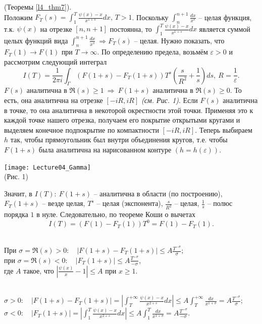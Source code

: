 \begin{pf} (Теоремы \ref{l4_thm7}).\\
	Положим $\displaystyle F_T(s) = \int_1^T \frac{\psi(x)-x}{x^{1+s}}dx, \, T>1$. Поскольку $\displaystyle \int_n^{n+1}\frac{dx}{x^s}$ -- целая функция, т.к. $\psi(x)$ на отрезке $[n, n+1]$ постоянна, то $\displaystyle \int_1^T \frac{\psi(x)-x}{x^{1+s}}dx$ является суммой целых функций вида $\displaystyle \int_n^{n+1}\frac{dx}{x^s} \ \Rightarrow F_T(s)$ -- целая. Нужно показать, что $F_T(1) \to F(1)$ при $T \to \infty$. По определению предела, возьмём $\varepsilon > 0$ и  рассмотрим следующий интеграл
	$$I(T) = \frac{1}{2\pi i}\int_\Gamma \left( F(1+s)-F_T(1+s) \right)T^s\left(\frac{s}{R^2}+\frac{1}{s}\right)ds, \ R = \frac{1}{\varepsilon}.$$
	$F(s)$ аналитична в $\Re(s) \geq 1 \ \Rightarrow \ F(1+s)$ аналитична в $\Re(s) \geq 0$. То есть, она аналитична на отрезке $[-iR, iR]$ \textit{(см. Рис. 1)}. Если $F(s)$ аналитична в точке, то она аналитична в некоторой окрестности этой точки. Применяя это к каждой точке нашего отрезка, получаем его покрытие открытыми кругами и выделяем конечное подпокрытие по компактности $[-iR, iR]$. Теперь выбираем $h$ так, чтобы прямоугольник был внутри объединения кругов, т.е. чтобы $F(1+s)$ была аналитична на нарисованном контуре $(h=h(\varepsilon))$.
	\begin{center}
		\texttt{[image: Lecture04\_Gamma]}~\\
		(Рис. 1)
	\end{center}
	Значит, в $I(T): \ F(1+s)$ -- аналитична в области (по построению), $F_T(1+s)$ -- везде целая, $T^s$ -- целая (экспонента), $\displaystyle \frac{s}{R^2}$ -- целая, $\displaystyle \frac{1}{s}$ -- полюс порядка $1$ в нуле. Следовательно, по теореме Коши о вычетах 
	$$I(T) = \left(F(1)-F_T(1)\right)T^0 = F(1)-F_T(1).$$
\end{pf}

\begin{lemma} \label{l4_lm13}~\\
	При $\displaystyle \sigma = \Re(s)>0: \quad \lvert F(1+s)-F_T(1+s) \rvert \leq A\frac{T^{-\sigma}}{\sigma}$;\\
	при $\displaystyle \sigma = \Re(s)<0: \quad \lvert F_T(1+s) \rvert \leq A\frac{T^{-\sigma}}{-\sigma}$,\\
	где $A$ такое, что $\displaystyle \left| \frac{\psi(x)}{x}-1 \right| \leq A$ при $x \geq 1$.
\end{lemma}
\begin{pf}~\\
	$\displaystyle \sigma>0: \quad \left| F(1+s)-F_T(1+s) \right| = \left| \int_T^{+\infty}\frac{\psi(x)-x}{x^{2+s}}dx \right| \leq A\int_T^{+\infty}\frac{dx}{x^{1+\sigma}} = A\frac{T^{-\sigma}}{\sigma}$;\\
	$\displaystyle \sigma<0: \quad \left| F_T(1+s) \right| = \left| \int_1^T\frac{\psi(x)-x}{x^{2+s}}dx \right| \leq A\int_1^T\frac{dx}{x^{1+\sigma}} = A\frac{T^{-\sigma}}{-\sigma}$.
\end{pf}